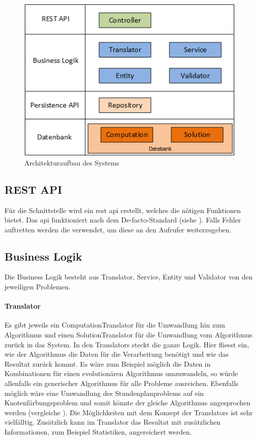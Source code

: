 \begin{figure}[h]
\centering
\includegraphics[scale=0.8]{images/visio/architektur_db.png}
\caption[Architekturaufbau des Systems]{Architekturaufbau des Systems \selfmade{}}
\label{fig:architektur}
\end{figure}
 
\FloatBarrier
\subsection{REST API}
Für die Schnittstelle wird ein \gls{rest} \gls{api} erstellt, welches die nötigen Funktionen bietet. Das \gls{api} funktioniert nach dem De-facto-Standard 
(siehe \cite{wiki_restful}). Falls Fehler auftretten werden die  verwendet, um diese an den Aufrufer weiterzugeben.

\subsection{Business Logik}
Die Business Logik besteht aus Translator, Service, Entity und Validator von den jeweiligen Problemen. 
\paragraph{Translator}
Es gibt jeweils ein ComputationTranslator für die Umwandlung hin zum Algorithmus und einen SolutionTranslator für die Umwandlung vom Algorithmus zurück in das System. In den Translators steckt 
die ganze Logik. Hier fliesst ein, wie der Algorithmus die Daten für die Verarbeitung benötigt und wie das Resultat zurück kommt. Es wäre zum Beispiel möglich die Daten in Kombinationen 
für einen evolutionären Algorithmus umzuwandeln, so würde allenfalls ein generischer Algorithmus für alle Probleme ausreichen. Ebenfalls möglich wäre eine Umwandlung des 
Stundenplanproblems auf ein Knotenfärbungsproblem und somit könnte der gleiche Algorithmus angesprochen werden (vergleiche \cite{timetabling_abdullah}). Die Möglichkeiten mit dem 
Konzept der Translators ist sehr vielfälltig. Zusätzlich kann im Translator das Resultat mit zusätzlichen Informationen, zum Beispiel Statistiken, angereichert werden.
